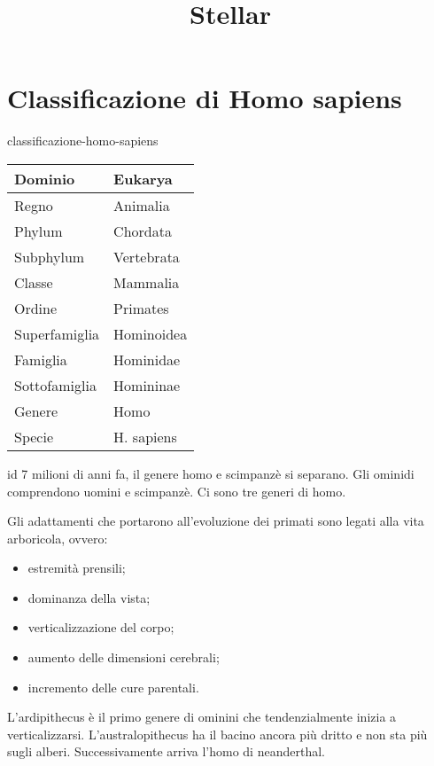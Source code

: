\documentclass[preview]{standalone}
\begin{document}
\title{Stellar}
\genpage

\section{Classificazione di Homo sapiens}

\begin{snippet}{classificazione-homo-sapiens}
    \vspace{0.25cm}
    \begin{center}
        \begin{tabular}{|l|l|}
            \hline Dominio & Eukarya \\
            \hline Regno & Animalia \\
            \hline Phylum & Chordata \\
            \hline Subphylum & Vertebrata \\
            \hline Classe & Mammalia \\
            \hline Ordine & Primates \\
            \hline Superfamiglia & Hominoidea \\
            \hline Famiglia & Hominidae \\
            \hline Sottofamiglia & Homininae \\
            \hline Genere & Homo \\
            \hline Specie & H. sapiens \\
            \hline
        \end{tabular}
    \end{center}
    \vspace{0.25cm}
\end{snippet}

\begin{snippet}{id}
    7 milioni di anni fa, il genere homo e scimpanzè si separano.
    Gli ominidi comprendono uomini e scimpanzè.
    Ci sono tre generi di homo.

    Gli adattamenti che portarono all'evoluzione dei primati sono legati alla
    vita arboricola, ovvero:
    \begin{itemize}
        \item estremità prensili;
        \item dominanza della vista;
        \item verticalizzazione del corpo;
        \item aumento delle dimensioni cerebrali;
        \item incremento delle cure parentali.
    \end{itemize}

    L'ardipithecus è il primo genere di ominini che tendenzialmente inizia a verticalizzarsi.
    L'australopithecus ha il bacino ancora più dritto e non sta più sugli alberi.
    Successivamente arriva l'homo di neanderthal.
\end{snippet}

\end{document}
